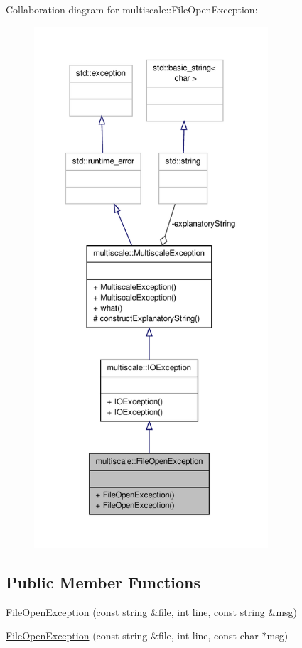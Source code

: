 Collaboration diagram for multiscale\-:\-:File\-Open\-Exception\-:\nopagebreak
\begin{figure}[H]
\begin{center}
\leavevmode
\includegraphics[height=550pt]{classmultiscale_1_1FileOpenException__coll__graph}
\end{center}
\end{figure}
\subsection*{Public Member Functions}
\begin{DoxyCompactItemize}
\item 
\hyperlink{classmultiscale_1_1FileOpenException_ae574327fb5ac6e396d8c37263f8a2815}{File\-Open\-Exception} (const string \&file, int line, const string \&msg)
\item 
\hyperlink{classmultiscale_1_1FileOpenException_adddaf8af54fd3bdeb5f63d5a6736fd45}{File\-Open\-Exception} (const string \&file, int line, const char $\ast$msg)
\end{DoxyCompactItemize}
